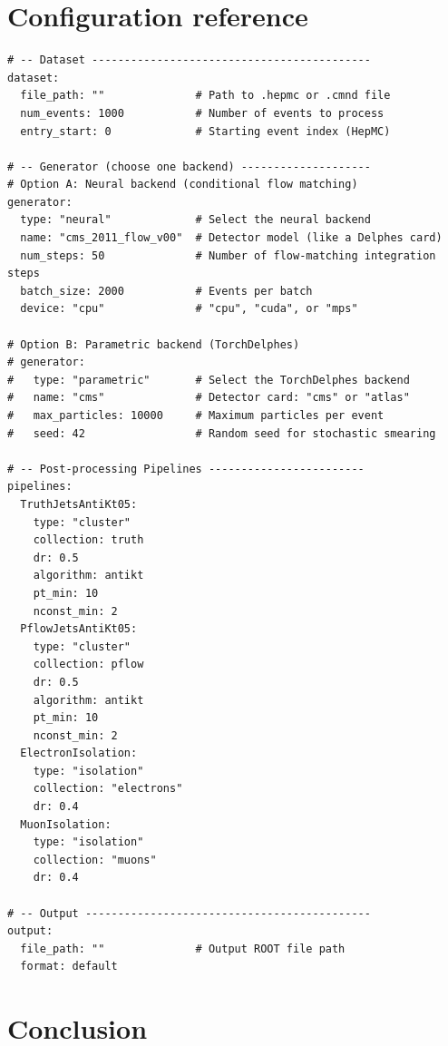 \documentclass[11pt,a4paper]{article}          %
\begin{document}
\section{Configuration reference}
\label{sec:config}

\begin{lstlisting}[style=yaml,caption={Annotated default configuration.},label=lst:config]
# -- Dataset -------------------------------------------
dataset:
  file_path: ""              # Path to .hepmc or .cmnd file
  num_events: 1000           # Number of events to process
  entry_start: 0             # Starting event index (HepMC)

# -- Generator (choose one backend) --------------------
# Option A: Neural backend (conditional flow matching)
generator:
  type: "neural"             # Select the neural backend
  name: "cms_2011_flow_v00"  # Detector model (like a Delphes card)
  num_steps: 50              # Number of flow-matching integration steps
  batch_size: 2000           # Events per batch
  device: "cpu"              # "cpu", "cuda", or "mps"

# Option B: Parametric backend (TorchDelphes)
# generator:
#   type: "parametric"       # Select the TorchDelphes backend
#   name: "cms"              # Detector card: "cms" or "atlas"
#   max_particles: 10000     # Maximum particles per event
#   seed: 42                 # Random seed for stochastic smearing

# -- Post-processing Pipelines ------------------------
pipelines:
  TruthJetsAntiKt05:
    type: "cluster"
    collection: truth
    dr: 0.5
    algorithm: antikt
    pt_min: 10
    nconst_min: 2
  PflowJetsAntiKt05:
    type: "cluster"
    collection: pflow
    dr: 0.5
    algorithm: antikt
    pt_min: 10
    nconst_min: 2
  ElectronIsolation:
    type: "isolation"
    collection: "electrons"
    dr: 0.4
  MuonIsolation:
    type: "isolation"
    collection: "muons"
    dr: 0.4

# -- Output --------------------------------------------
output:
  file_path: ""              # Output ROOT file path
  format: default
\end{lstlisting}

\section{Conclusion}
\label{sec:conclusion}
\end{document}
